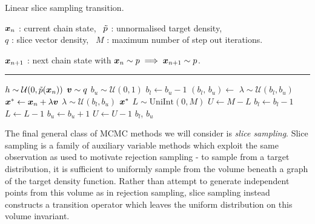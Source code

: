 \begin{algorithm}[!t]
\caption{Linear slice sampling transition.}
\label{alg:linear-slice-sampling}
\begin{algorithmic}
\small
    \Require
    $\boldsymbol{x}_n$ : current chain state,~
    $\tilde{p}$ : unnormalised target density,\\
    $q$ : slice vector density,~
    $M$ : maximum number of step out iterations.
    \Ensure\raggedright
    $\boldsymbol{x}_{n+1}$ : next chain state with $\boldsymbol{x}_n \sim p \implies \boldsymbol{x}_{n+1} \sim p$.
\end{algorithmic}
\hrule
\small
\begin{algorithmic}[1]
  \State $h \sim \mathcal{U}\lpa 0,\utgtdens(\vct{x}_n)\rpa$ 
  \State $\boldsymbol{v} \sim q$ \label{algline:slice-sample-direction}
  \State $b_u \sim \mathcal{U}(0,1)$  
  \State $b_l \gets b_u - 1$
   $(b_l,\,b_u) \gets $ \EndIf
  \State $\lambda \sim \mathcal{U}(b_l, b_u)$
    \State $\boldsymbol{x}^* \gets \boldsymbol{x}_n + \lambda \boldsymbol{v}$  
      \State $\lambda \sim \mathcal{U}(b_l, b_u)$  
    \Else {}
      \State \Return $\boldsymbol{x}^*$
    \EndIf
  \EndWhile
    \State $L \sim \textrm{UniInt}(0, M)$ 
    \State $U \gets M - L$
    \While{$L > 0$ \textbf{and}\xspace $\utgtdens(\vct{x}_n + b_l \vct{v}) > h$} 
      \State $b_l \gets b_l - 1$
      \State $L \gets L - 1$
    \EndWhile
    \While{$U > 0$ \textbf{and}\xspace$\utgtdens(\vct{x}_n + b_u \vct{v}) > h$} 
      \State $b_u \gets b_u + 1$
      \State $U \gets U - 1$
    \EndWhile
    \State\Return $b_l$, $b_u$
  \EndFunction
\end{algorithmic}
\end{algorithm}

The final general class of \ac{MCMC} methods we will consider is \emph{slice sampling}. Slice sampling is a family of auxiliary variable methods which exploit the same observation as used to motivate rejection sampling - to sample from a target distribution, it is sufficient to uniformly sample from the volume beneath a graph of the target density function. Rather than attempt to generate independent points from this volume as in rejection sampling, slice sampling instead constructs a transition operator which leaves the uniform distribution on this volume invariant.

